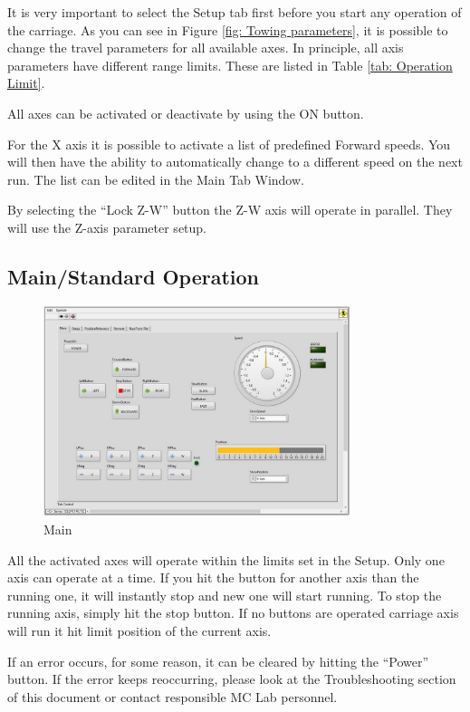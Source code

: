 \documentclass[a4paper,twoside,english]{report}
\begin{document}
It is very important to select the Setup tab first before you start
any operation of the carriage. As you can see in Figure \ref{fig: Towing parameters},
it is possible to change the travel parameters for all available axes.
In principle, all axis parameters have different range limits. These
are listed in Table \ref{tab: Operation Limit}.

All axes can be activated or deactivate by using the ON button.

For the X axis it is possible to activate a list of predefined Forward
speeds. You will then have the ability to automatically change to
a different speed on the next run. The list can be edited in the Main
Tab Window.

By selecting the ``Lock Z-W'' button the Z-W axis will operate in
parallel. They will use the Z-axis parameter setup.

\subsection{Main/Standard Operation}

\begin{figure}
\centering \includegraphics[width=0.8\textwidth]{fig/towing_main} \caption{\label{fig: Towing main}Main}
\end{figure}

All the activated axes will operate within the limits set in the Setup.
Only one axis can operate at a time. If you hit the button for another
axis than the running one, it will instantly stop and new one will
start running. To stop the running axis, simply hit the stop button.
If no buttons are operated carriage axis will run it hit limit position
of the current axis.

If an error occurs, for some reason, it can be cleared by hitting
the ``Power'' button. If the error keeps reoccurring, please look
at the Troubleshooting section of this document or contact responsible
MC Lab personnel.
\end{document}
